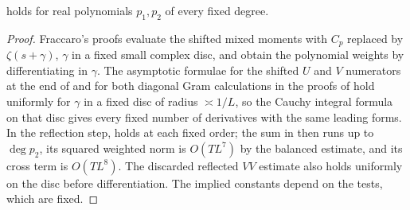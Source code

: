 \documentclass[11pt,colorlinks]{charlie}
\begin{document}
\begin{lemma}\label{lem:degree}
 holds for real polynomials $p_1,p_2$ of every fixed degree.
\end{lemma}
\begin{proof}
Fraccaro's proofs evaluate the shifted mixed moments with $C_p$ replaced by $\zeta(s+\gamma)$, $\gamma$ in a fixed small complex disc, and obtain the polynomial weights by differentiating in $\gamma$. The asymptotic formulae for the shifted $U$ and $V$ numerators at the end of \cite[\S\S2.2.3--2.2.4]{Fraccaro} and for both diagonal Gram calculations in the proofs of \cite[Props.~7--8]{Fraccaro} hold uniformly for $\gamma$ in a fixed disc of radius $\asymp1/L$, so the Cauchy integral formula on that disc gives every fixed number of derivatives with the same leading forms. In the reflection step, \cite[Lemma~6]{Fraccaro} holds at each fixed order; the sum in \cite[(2.64)]{Fraccaro} then runs up to $\deg p_2$, its squared weighted norm is $O(TL^7)$ by the balanced estimate, and its cross term is $O(TL^8)$. The discarded reflected $VV$ estimate also holds uniformly on the disc before differentiation. The implied constants depend on the tests, which are fixed.
\end{proof}
\end{document}
